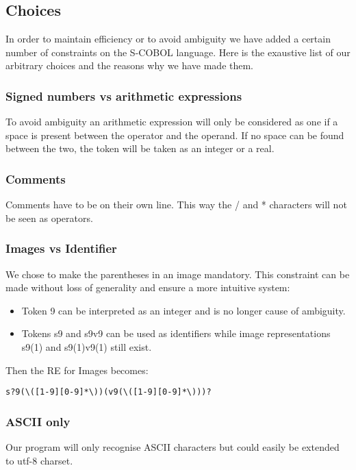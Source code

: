 \subsection{Choices}

In order to maintain efficiency or to avoid ambiguity we have added a certain number of constraints on the S-COBOL language. Here is the exaustive list of our arbitrary choices and the reasons why we have made them.

\subsubsection{Signed numbers vs arithmetic expressions}

To avoid ambiguity an arithmetic expression will only be considered as one if a space is present between the operator and the operand. If no space can be found between the two, the token will be taken as an integer or a real.

\subsubsection{Comments}

Comments have to be on their own line. This way the / and * characters will not be seen as operators.

\subsubsection{Images vs Identifier}

We chose to make the parentheses in an image mandatory. This constraint can be made without loss of generality and ensure a more intuitive system:

\begin{itemize}
	\item Token 9 can be interpreted as an integer and is no longer cause of ambiguity.
	\item Tokens s9 and s9v9 can be used as identifiers while image representations s9(1) and s9(1)v9(1) still exist.  
\end{itemize}

Then the RE for Images becomes:

\begin{verbatim}
s?9(\([1-9][0-9]*\))(v9(\([1-9][0-9]*\)))?
\end{verbatim}

\subsubsection{ASCII only}

Our program will only recognise ASCII characters but could easily be extended to utf-8 charset.





